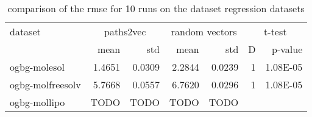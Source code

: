 \begin{table}[h!]
    \centering
    \begin{tabular}{@{}lrrrrrr@{}}
        \toprule
        dataset          & \multicolumn{2}{c}{paths2vec} & \multicolumn{2}{c}{random vectors} & \multicolumn{2}{c}{t-test}                         \\ \cmidrule(l){2-3}\cmidrule(l){4-5}\cmidrule(l){6-7}
                         & mean                          & std                                & mean                       & std    & D & p-value  \\ \midrule
        ogbg-molesol     & 1.4651                        & 0.0309                             & 2.2844                     & 0.0239 & 1 & 1.08E-05 \\
        ogbg-molfreesolv & 5.7668                        & 0.0557                             & 6.7620                     & 0.0296 & 1 & 1.08E-05 \\
        ogbg-mollipo     & TODO                          & TODO                               & TODO                       & TODO   &   &          \\ \bottomrule
    \end{tabular}
    \caption{comparison of the rmse for 10 runs on the dataset regression datasets}
    \label{table:ogbg-molfreesolv_results}
\end{table}

%
%
%
%

